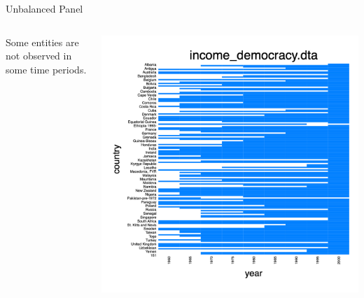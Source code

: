 \documentclass[
  10pt,
  ignorenonframetext,
]{beamer}
\begin{document}
\begin{frame}{Unbalanced Panel}
\protect\hypertarget{unbalanced-panel}{}
\begin{columns}[T]
\begin{column}{.3\textwidth}
\vspace{2cm}

\small

Some entities are not observed in some time periods.
\end{column}

\begin{column}{0.48\textwidth}
\begin{flushright}\includegraphics[width=1.25\linewidth]{pictures/Q2-panelView-unbalanced} \end{flushright}
\end{column}
\end{columns}
\end{frame}
\end{document}
